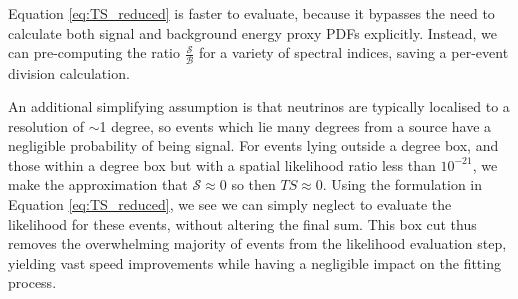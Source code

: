 Equation \ref{eq:TS_reduced}  is faster to evaluate, because it bypasses the need to calculate both signal and background energy proxy PDFs explicitly. Instead, we can pre-computing the ratio $\frac{\mathcal{S}}{\mathcal{B}}$ for a variety of spectral indices, saving a per-event division calculation.

An additional simplifying assumption is that neutrinos are typically localised to a resolution of $\sim$1 degree, so events which lie many degrees from a source have a negligible probability of being signal. For events lying outside a  degree box, and those within a  degree box but with a spatial likelihood ratio less than $10^{-21}$, we make the approximation that $\mathcal{S} \approx 0$ so then $TS \approx 0$. Using the formulation in Equation \ref{eq:TS_reduced}, we see we can simply neglect to evaluate the likelihood for these events, without altering the final sum. This box cut thus removes the overwhelming majority of events from the likelihood evaluation step, yielding vast speed improvements while having a negligible impact on the fitting process.

